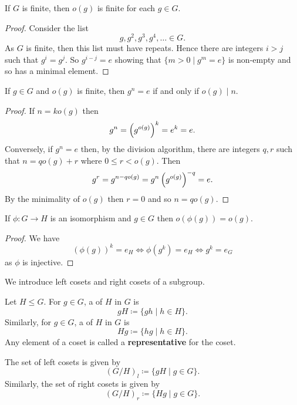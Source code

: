 \begin{proposition}
If $G$ is finite, then $o(g)$ is finite for each $g\in G$.
\end{proposition}

\begin{proof}
Consider the list
\[g,g^2,g^3,g^4,\dots\in G.\]
As $G$ is finite, then this list must have repeats. Hence there are integers $i>j$ such that $g^i=g^j$. So $g^{i-j}=e$ showing that $\{m>0\mid g^m=e\}$ is non-empty and so has a minimal element.
\end{proof}

\begin{proposition}
If $g\in G$ and $o(g)$ is finite, then $g^n=e$ if and only if $o(g)\mid n$.
\end{proposition}

\begin{proof}
If $n=ko(g)$ then 
\[g^n=\left(g^{o(g)}\right)^k=e^k=e.\]
Conversely, if $g^n=e$ then, by the division algorithm, there are integers $q, r$ such that $n=qo(g)+r$ where $0\le r<o(g)$. Then
\[g^r=g^{n-qo(g)}=g^n\left(g^{o(g)}\right)^{-q}=e.\]
By the minimality of $o(g)$ then $r=0$ and so $n=qo(g)$.
\end{proof}

\begin{proposition}
If $\phi:G\to H$ is an isomorphism and $g\in G$ then $o(\phi(g))=o(g)$.
\end{proposition}

\begin{proof}
We have
\[(\phi(g))^k=e_H\iff\phi(g^k)=e_H\iff g^k=e_G\]
as $\phi$ is injective.
\end{proof}

We introduce left cosets and right cosets of a subgroup.

\begin{definition}[Coset]
Let $H\le G$. For $g\in G$, a  of $H$ in $G$ is 
\[gH\coloneqq\{gh\mid h\in H\}.\]
Similarly, for $g\in G$, a  of $H$ in $G$ is
\[Hg\coloneqq\{hg\mid h\in H\}.\]
Any element of a coset is called a \textbf{representative} for the coset.
\end{definition}

The set of left cosets is given by
\[(G/H)_{l}\coloneqq\{gH\mid g\in G\}.\]
Similarly, the set of right cosets is given by
\[(G/H)_{r}\coloneqq\{Hg\mid g\in G\}.\]

